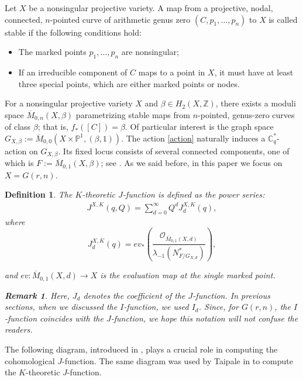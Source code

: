 \documentclass{amsart}
\newtheorem{definition}{Definition}
\newtheorem{remark}[thm]{Remark}
\begin{document}
 Let $X$ be a nonsingular projective variety. A map from a projective, nodal, connected, $n$-pointed curve of arithmetic genus zero $(C, p_1, \dots, p_n)$ to $X$ is called stable if the following conditions hold:
 \begin{itemize}
     \item The marked points $p_1,\dots,p_n$ are nonsingular;
     \item If an irreducible component of $C$ maps to a point in $X$, it must have at least three special points, which are either marked points or nodes.
 \end{itemize}
 For a nonsingular projective variety $X$ and $\beta \in H_2(X,\mathbb{Z})$, there exists a moduli space $\overline{M}_{0,n}(X,\beta)$ parametrizing stable maps from $n$-pointed, genus-zero curves of class $\beta$; that is, $f_*([C]) = \beta$.
Of particular interest is the graph space $G_{X,\beta} := \overline{M}_{0,0}(X \times \mathbb{P}^1,(\beta,1))$. 
 The action \eqref{action} naturally induces a $\mathbb{C}_q^*$-action on $G_{X,\beta}$. Its fixed locus consists of several connected components, one of which is $F:=\overline{M}_{0,1}(X,\beta)$; see \cite[Section 1]{Bertram:2003qd}.
 As we said before, in this paper we focus on $X=G(r,n)$. 
 \begin{definition}
     The $K$-theoretic $J$-function is defined as the power series:
 \begin{align*}
 J^{X,K}(q,Q) = \sum_{d=0}^{\infty}Q^dJ_d^{X,K}(q),
\end{align*}
 where
 \[
 J_d^{X,K}(q) = ev_*\!\left(\frac{\mathcal{O}_{\overline{M}_{0,1}(X,d)}}{\lambda_{-1}(N^*_{F/G_{X,d}})}\right),
 \]

  and $ev:\overline{M}_{0,1}(X,d) \to X$ is the evaluation map at the single marked point.
  \begin{remark}
      Here, $J_d$ denotes the coefficient of the $J$-function. In previous sections, when we discussed the $I$-function, we used $I_d$. Since, for $G(r,n)$, the $I$-function coincides with the $J$-function, we hope this notation will not confuse the readers.
\end{remark}

 \end{definition}
The following diagram, introduced in \cite{Bertram:2003qd}, plays a crucial role in computing the cohomological $J$-function. The same diagram was used by Taipale in \cite{Taipale} to compute the $K$-theoretic $J$-function.
\end{document}
